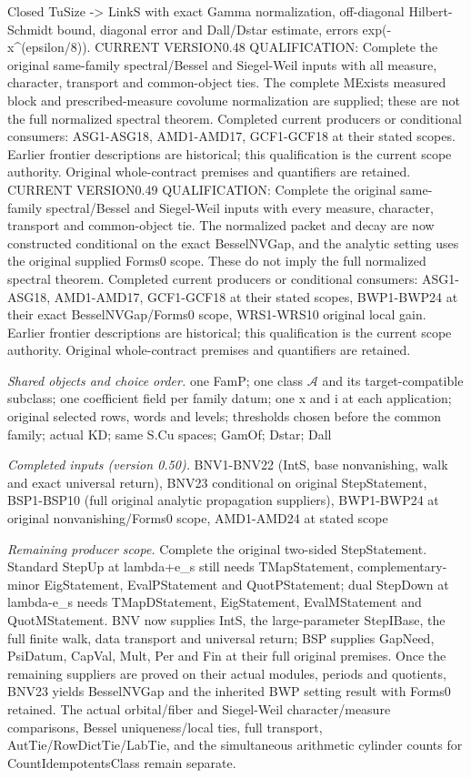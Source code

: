 \documentclass[11pt,a4paper]{article}
\numberwithin{equation}{section}
\theoremstyle{remark}\newtheorem{remark}[theorem]{Remark}
\begin{document}
Closed TuSize -> LinkS with exact Gamma normalization, off-diagonal Hilbert-Schmidt bound, diagonal error and Dall/Dstar estimate, errors exp(-x\textasciicircum{}(epsilon/8)). CURRENT VERSION0.48 QUALIFICATION: Complete the original same-family spectral/Bessel and Siegel-Weil inputs with all measure, character, transport and common-object ties. The complete MExists measured block and prescribed-measure covolume normalization are supplied; these are not the full normalized spectral theorem. Completed current producers or conditional consumers: ASG1-ASG18, AMD1-AMD17, GCF1-GCF18 at their stated scopes. Earlier frontier descriptions are historical; this qualification is the current scope authority. Original whole-contract premises and quantifiers are retained. CURRENT VERSION0.49 QUALIFICATION: Complete the original same-family spectral/Bessel and Siegel-Weil inputs with every measure, character, transport and common-object tie. The normalized packet and decay are now constructed conditional on the exact BesselNVGap, and the analytic setting uses the original supplied Forms0 scope. These do not imply the full normalized spectral theorem. Completed current producers or conditional consumers: ASG1-ASG18, AMD1-AMD17, GCF1-GCF18 at their stated scopes, BWP1-BWP24 at their exact BesselNVGap/Forms0 scope, WRS1-WRS10 original local gain. Earlier frontier descriptions are historical; this qualification is the current scope authority. Original whole-contract premises and quantifiers are retained.

\emph{Shared objects and choice order.} one FamP; one class $\mathcal A$ and its target-compatible subclass; one coefficient field per family datum; one x and i at each application; original selected rows, words and levels; thresholds chosen before the common family; actual KD; same S.Cu spaces; GamOf; Dstar; Dall

\emph{Completed inputs (version 0.50).} BNV1-BNV22 (IntS, base nonvanishing, walk and exact universal return), BNV23 conditional on original StepStatement, BSP1-BSP10 (full original analytic propagation suppliers), BWP1-BWP24 at original nonvanishing/Forms0 scope, AMD1-AMD24 at stated scope

\emph{Remaining producer scope.} Complete the original two-sided StepStatement. Standard StepUp at lambda+e\_\allowbreak s still needs TMapStatement, complementary-minor EigStatement, EvalPStatement and QuotPStatement; dual StepDown at lambda-e\_\allowbreak s needs TMapDStatement, EigStatement, EvalMStatement and QuotMStatement. BNV now supplies IntS, the large-parameter StepIBase, the full finite walk, data transport and universal return; BSP supplies GapNeed, PsiDatum, CapVal, Mult, Per and Fin at their full original premises. Once the remaining suppliers are proved on their actual modules, periods and quotients, BNV23 yields BesselNVGap and the inherited BWP setting result with Forms0 retained. The actual orbital/fiber and Siegel-Weil character/measure comparisons, Bessel uniqueness/local ties, full transport, AutTie/RowDictTie/LabTie, and the simultaneous arithmetic cylinder counts for CountIdempotentsClass remain separate.
\end{document}
